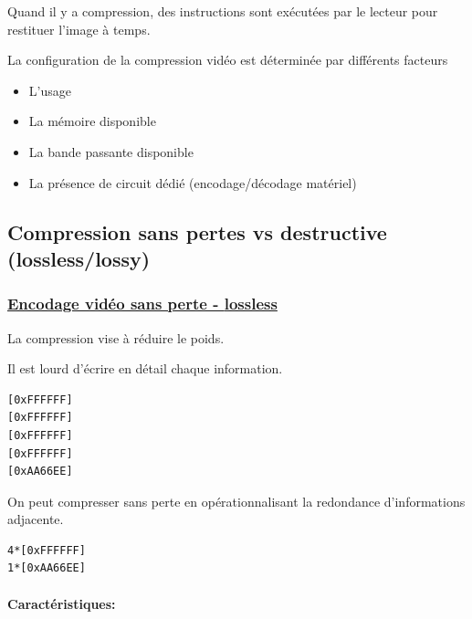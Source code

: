 \documentclass[
  french,
]{book}
\providecommand{\tightlist}{%
  \setlength{\itemsep}{0pt}\setlength{\parskip}{0pt}}
\begin{document}
Quand il y a compression, des instructions sont exécutées par le lecteur pour restituer l'image à temps.

La configuration de la compression vidéo est déterminée par différents facteurs

\begin{itemize}
\tightlist
\item
  L'usage
\item
  La mémoire disponible
\item
  La bande passante disponible
\item
  La présence de circuit dédié (encodage/décodage matériel)
\end{itemize}

\hypertarget{compression-sans-pertes-vs-destructive-losslesslossy}{%
\subsection{Compression sans pertes vs destructive (lossless/lossy)}\label{compression-sans-pertes-vs-destructive-losslesslossy}}

\hypertarget{encodage-viduxe9o-sans-perte---lossless}{%
\subsubsection{\texorpdfstring{\href{https://en.wikipedia.org/wiki/List_of_codecs\#Lossless_video_compression}{Encodage vidéo sans perte - \textbf{lossless}}}{Encodage vidéo sans perte - lossless}}\label{encodage-viduxe9o-sans-perte---lossless}}

La compression vise à réduire le poids.

Il est lourd d'écrire en détail chaque information.

\begin{verbatim}
[0xFFFFFF]
[0xFFFFFF]
[0xFFFFFF]
[0xFFFFFF]
[0xAA66EE]
\end{verbatim}

On peut compresser sans perte en opérationnalisant la redondance d'informations adjacente.

\begin{verbatim}
4*[0xFFFFFF]
1*[0xAA66EE]
\end{verbatim}

\hypertarget{caractuxe9ristiques}{%
\paragraph{Caractéristiques:}\label{caractuxe9ristiques}}
\end{document}
